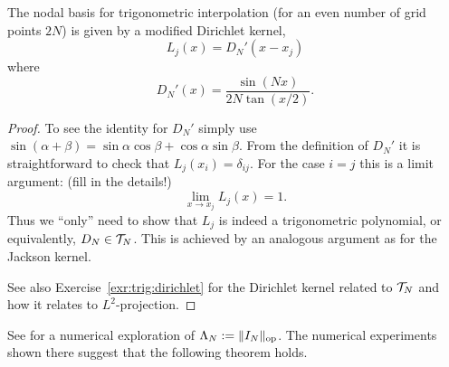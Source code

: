 \begin{lemma}
  The nodal basis for trigonometric interpolation (for an even number of
  grid points $2N$) is given by a modified Dirichlet kernel,
  \[
    L_j(x) = D_N'(x-x_j)
  \]
  where
  \[
    D_N'(x) = \frac{\sin(Nx)}{2N \tan(x/2)}.
  \]
\end{lemma}
\begin{proof}
  To see the identity for $D_N'$ simply use $\sin(\alpha+\beta) =
      \sin\alpha\cos\beta + \cos\alpha\sin\beta$. From the definition of $D_N'$
      it is straightforward to check that $L_j(x_i) = \delta_{ij}$. For the case
      $i = j$ this is a limit argument: (fill in the details!)
  \[
    \lim_{x \to x_j} L_j(x) = 1.
  \]
  Thus we ``only'' need to show that $L_j$ is indeed a trigonometric polynomial,
  or equivalently, $D_N \in \mathcal{T}_N$. This is achieved by an analogous argument
  as for the Jackson kernel.

  See also Exercise~\ref{exr:trig:dirichlet} for the Dirichlet kernel related to
  $\mathcal{T}_N$ and how it relates to $L^2$-projection.
\end{proof}


See \nbtrig for a numerical exploration of $\Lambda_N := \|I_N\|_{\rm op}$. The
numerical experiments shown there suggest that the following theorem holds.

